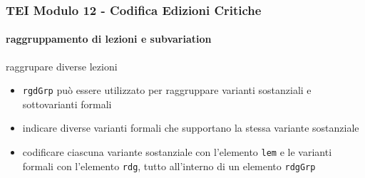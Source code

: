 \begin{frame}
    \frametitle{TEI Modulo 12 - Codifica Edizioni Critiche}
    \framesubtitle{raggruppamento di lezioni e subvariation}
    \addtocounter{nframe}{1}










    \begin{block}{raggrupare diverse lezioni}
        \begin{itemize}
            \item \texttt{rgdGrp} può essere utilizzato per raggruppare varianti sostanziali e sottovarianti formali
            \item indicare diverse varianti formali che supportano la stessa variante sostanziale
            \item codificare ciascuna variante sostanziale con l'elemento \texttt{lem} e le varianti formali con l'elemento \texttt{rdg}, tutto all'interno di un elemento \texttt{rdgGrp}
        \end{itemize}
    \end{block}

\end{frame}


